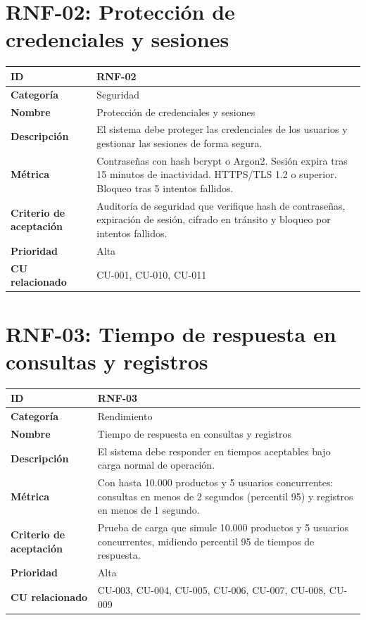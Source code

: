 \documentclass{article}
\begin{document}
\section*{RNF-02: Protección de credenciales y sesiones}
\begin{center}
\renewcommand{\arraystretch}{1.4}
\begin{tabular}{|L{4cm}|L{12cm}|}
\hline
\textbf{ID} & RNF-02 \\
\hline
\textbf{Categoría} & Seguridad \\
\hline
\textbf{Nombre} & Protección de credenciales y sesiones \\
\hline
\textbf{Descripción} & El sistema debe proteger las credenciales de los usuarios y gestionar las sesiones de forma segura. \\
\hline
\textbf{Métrica} & Contraseñas con hash bcrypt o Argon2. Sesión expira tras 15 minutos de inactividad. HTTPS/TLS 1.2 o superior. Bloqueo tras 5 intentos fallidos. \\
\hline
\textbf{Criterio de aceptación} & Auditoría de seguridad que verifique hash de contraseñas, expiración de sesión, cifrado en tránsito y bloqueo por intentos fallidos. \\
\hline
\textbf{Prioridad} & Alta \\
\hline
\textbf{CU relacionado} & CU-001, CU-010, CU-011 \\
\hline
\end{tabular}
\end{center}

\section*{RNF-03: Tiempo de respuesta en consultas y registros}
\begin{center}
\renewcommand{\arraystretch}{1.4}
\begin{tabular}{|L{4cm}|L{12cm}|}
\hline
\textbf{ID} & RNF-03 \\
\hline
\textbf{Categoría} & Rendimiento \\
\hline
\textbf{Nombre} & Tiempo de respuesta en consultas y registros \\
\hline
\textbf{Descripción} & El sistema debe responder en tiempos aceptables bajo carga normal de operación. \\
\hline
\textbf{Métrica} & Con hasta 10.000 productos y 5 usuarios concurrentes: consultas en menos de 2 segundos (percentil 95) y registros en menos de 1 segundo. \\
\hline
\textbf{Criterio de aceptación} & Prueba de carga que simule 10.000 productos y 5 usuarios concurrentes, midiendo percentil 95 de tiempos de respuesta. \\
\hline
\textbf{Prioridad} & Alta \\
\hline
\textbf{CU relacionado} & CU-003, CU-004, CU-005, CU-006, CU-007, CU-008, CU-009 \\
\hline
\end{tabular}
\end{center}
\end{document}
